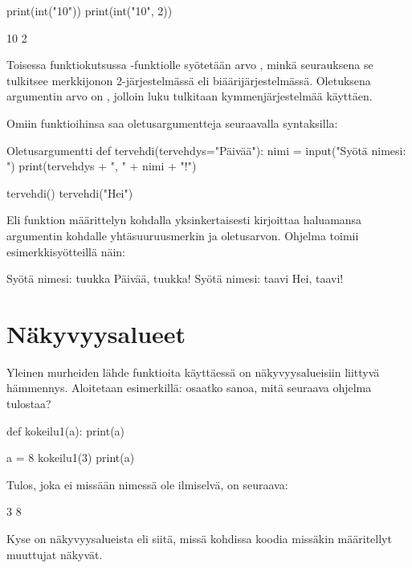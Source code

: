 \begin{python}
print(int("10"))
print(int("10", 2))
\end{python}

\begin{output}
10
2
\end{output}

Toisessa funktiokutsussa -funktiolle syötetään arvo , minkä seurauksena se tulkitsee merkkijonon  2-järjestelmässä eli biäärijärjestelmässä. Oletuksena argumentin arvo on , jolloin luku tulkitaan kymmenjärjestelmää käyttäen.

Omiin funktioihinsa saa oletusargumentteja seuraavalla syntaksilla:

\begin{example}{Oletusargumentti}
def tervehdi(tervehdys="Päivää"):
        nimi = input("Syötä nimesi: ")
        print(tervehdys + ", " + nimi + "!")

tervehdi()
tervehdi("Hei")
\end{example}

Eli funktion määrittelyn kohdalla yksinkertaisesti kirjoittaa haluamansa argumentin kohdalle yhtäsuuruusmerkin ja oletusarvon. Ohjelma toimii esimerkkisyötteillä näin:

\begin{output}
Syötä nimesi: tuukka
Päivää, tuukka!
Syötä nimesi: taavi
Hei, taavi!
\end{output}

\section{Näkyvyysalueet}

Yleinen murheiden lähde funktioita käyttäessä on näkyvyysalueisiin liittyvä hämmennys. Aloitetaan esimerkillä: osaatko sanoa, mitä seuraava ohjelma tulostaa?

\begin{python}
def kokeilu1(a):
        print(a)

a = 8
kokeilu1(3)
print(a)
\end{python}

Tulos, joka ei missään nimessä ole ilmiselvä, on seuraava:

\begin{output}
3
8
\end{output}

Kyse on näkyvyysalueista eli siitä, missä kohdissa koodia missäkin määritellyt muuttujat näkyvät.

